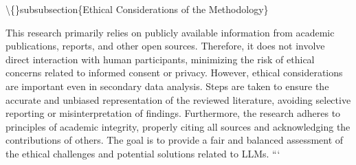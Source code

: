 \documentclass{article}
\begin{document}
\textbackslash\{\}subsubsection\{Ethical Considerations of the Methodology\}

This research primarily relies on publicly available information from academic publications, reports, and other open sources. Therefore, it does not involve direct interaction with human participants, minimizing the risk of ethical concerns related to informed consent or privacy. However, ethical considerations are important even in secondary data analysis. Steps are taken to ensure the accurate and unbiased representation of the reviewed literature, avoiding selective reporting or misinterpretation of findings. Furthermore, the research adheres to principles of academic integrity, properly citing all sources and acknowledging the contributions of others. The goal is to provide a fair and balanced assessment of the ethical challenges and potential solutions related to LLMs.
```
\end{document}
